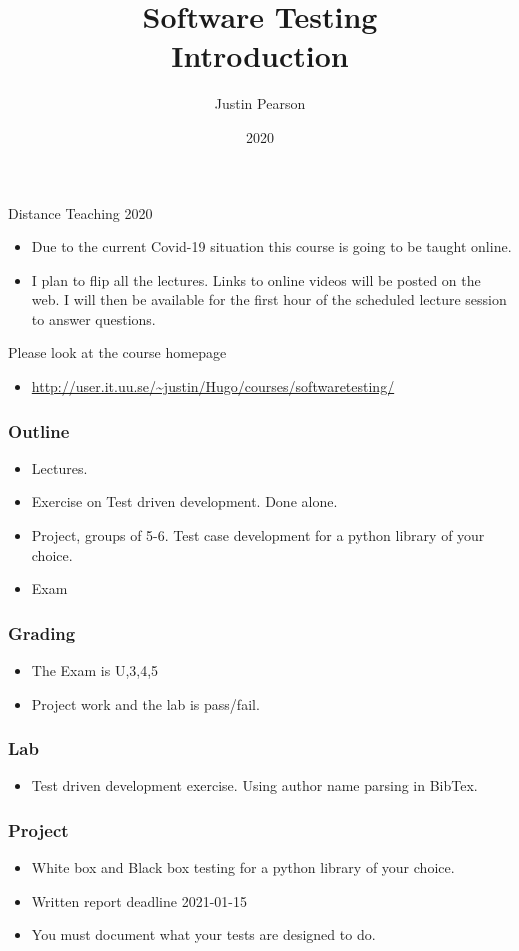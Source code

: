 \documentclass{beamer}
\title{Software Testing \\ Introduction}
\author{Justin Pearson}
\date{2020}
\begin{document}
\lstset{language=python}

\begin{frame}
  \maketitle
\end{frame}
\begin{frame}{Distance Teaching 2020}
  \begin{itemize}
  \item   Due to the current Covid-19 situation this course is going to be
  taught online. 
 \item  I plan to flip all the lectures. Links to online videos will
   be posted on the web. I will then  be available for the first hour
   of the scheduled lecture session to answer questions.
 \end{itemize}
 Please look at the course homepage
 \begin{itemize}
 \item \url{http://user.it.uu.se/~justin/Hugo/courses/softwaretesting/}
 \end{itemize}
\end{frame}
\begin{frame}
  \frametitle{Outline}
  \begin{itemize}
  \item Lectures.
  \item Exercise on Test driven development. Done alone.
  \item Project, groups of 5-6. Test case development for a python
    library of your choice.
  \item Exam
  \end{itemize}
\end{frame}
\begin{frame}
  \frametitle{Grading}
  \begin{itemize}
  \item The Exam is U,3,4,5
  \item Project work and the lab is pass/fail.
  \end{itemize}
\end{frame}
\begin{frame}
  \frametitle{Lab}
  \begin{itemize}
  \item Test driven development exercise. Using author name parsing in
    BibTex. 
  \end{itemize}
\end{frame}
\begin{frame}
  \frametitle{Project}
  \begin{itemize}
  \item White box and Black box testing for a python library of your choice.
  \item Written report deadline 2021-01-15
  \item You must document what your tests are designed to do.
  \end{itemize}
\end{frame}
\end{document}
